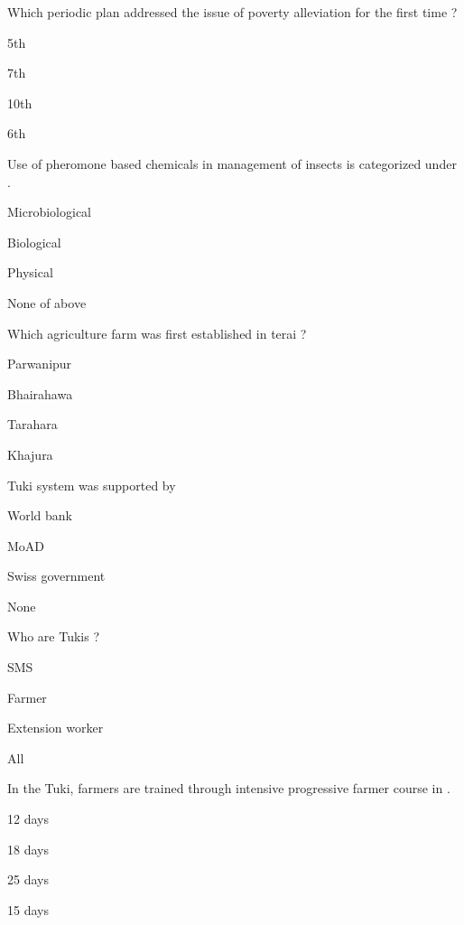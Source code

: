 \begin{questions}
\question Which periodic plan addressed the issue of poverty alleviation for the first time ?
\begin{items}
\item* 5th
\item 7th
\item 10th
\item 6th
\end{items}

\question Use of pheromone based chemicals in management of insects is categorized under \fillin[][3cm].
\begin{items}
\item Microbiological
\item Biological
\item Physical
\item* None of above
\end{items}

\question Which agriculture farm was first established in terai ?
\begin{items}
\item* Parwanipur
\item Bhairahawa
\item Tarahara
\item Khajura
\end{items}

\question Tuki system was supported by
\begin{items}
\item World bank
\item MoAD
\item* Swiss government
\item None
\end{items}

\question Who are Tukis ?
\begin{items}
\item SMS
\item* Farmer
\item Extension worker
\item All
\end{items}

\question In the Tuki, farmers are trained through intensive progressive farmer course in \fillin[][3cm].
\begin{items}
\item 12 days
\item 18 days
\item 25 days
\item* 15 days
\end{items}


\end{questions}
